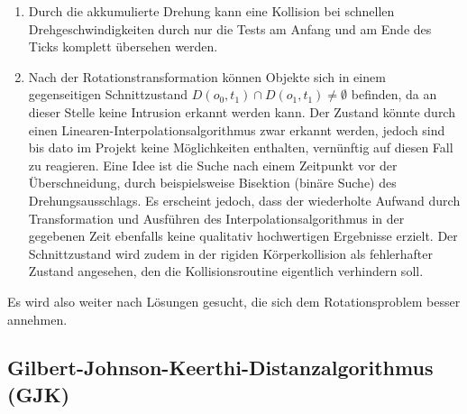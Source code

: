 \begin{enumerate}
\item Durch die akkumulierte Drehung kann eine Kollision bei schnellen Drehgeschwindigkeiten durch nur die Tests am Anfang und am Ende des Ticks komplett übersehen werden.
\item Nach der Rotationstransformation können Objekte sich in einem gegenseitigen Schnittzustand $D(o_0, t_1)\cap D(o_1, t_1) \neq \emptyset$ befinden, da an dieser Stelle keine Intrusion erkannt werden kann. Der Zustand könnte durch einen Linearen-Interpolationsalgorithmus zwar erkannt werden, jedoch sind bis dato im Projekt keine Möglichkeiten enthalten, vernünftig auf diesen Fall zu reagieren.
Eine Idee ist die Suche nach einem Zeitpunkt vor der Überschneidung, durch beispielsweise Bisektion (binäre Suche) des Drehungsausschlags. Es erscheint jedoch, dass der wiederholte Aufwand durch Transformation und Ausführen des Interpolationsalgorithmus in der gegebenen Zeit ebenfalls keine qualitativ hochwertigen Ergebnisse erzielt. Der Schnittzustand wird zudem in der rigiden Körperkollision als fehlerhafter Zustand angesehen, den die Kollisionsroutine eigentlich verhindern soll.
\end{enumerate}


Es wird also weiter nach Lösungen gesucht, die sich dem Rotationsproblem besser annehmen.

\subsection{Gilbert-Johnson-Keerthi-Distanzalgorithmus (GJK)}
\label{sec:gjk}

